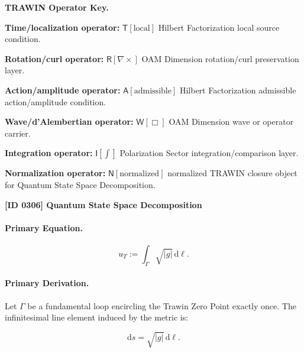 \par\vspace{0.45\baselineskip}
\noindent\begin{minipage}[t]{\linewidth}
\begingroup
\small
\raggedright
\textbf{TRAWIN Operator Key.}\par
\noindent\textbf{Time/localization operator:} $\mathsf{T}\!\left[\mathrm{local}\right]$ Hilbert Factorization local source condition.\par
\noindent\textbf{Rotation/curl operator:} $\mathsf{R}\!\left[\nabla\times\right]$ OAM Dimension rotation/curl preservation layer.\par
\noindent\textbf{Action/amplitude operator:} $\mathsf{A}\!\left[\mathrm{admissible}\right]$ Hilbert Factorization admissible action/amplitude condition.\par
\noindent\textbf{Wave/d'Alembertian operator:} $\mathsf{W}\!\left[\Box\right]$ OAM Dimension wave or operator carrier.\par
\noindent\textbf{Integration operator:} $\mathsf{I}\!\left[\int\right]$ Polarization Sector integration/comparison layer.\par
\noindent\textbf{Normalization operator:} $\mathsf{N}\!\left[\mathrm{normalized}\right]$ normalized TRAWIN closure object for Quantum State Space Decomposition.\par
\endgroup
\end{minipage}

\clearpage
\noindent\textbf{[ID 0306] Quantum State Space Decomposition}\par
\vspace{0.35em}
\paragraph{Primary Equation.}
\begin{equation}
u_T := \int_{\Gamma}\sqrt{|g|}\,\mathrm{d}\ell .
\end{equation}

\paragraph{Primary Derivation.}
Let $\Gamma$ be a fundamental loop encircling the Trawin Zero Point exactly once.  
The infinitesimal line element induced by the metric is:

\begin{equation}
\mathrm{d}s = \sqrt{|g|}\,\mathrm{d}\ell .
\end{equation}

